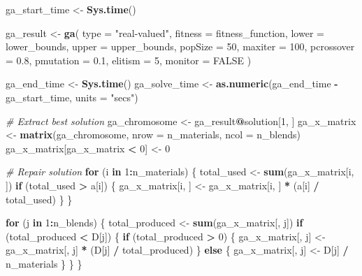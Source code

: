 \documentclass[
]{article}
\newenvironment{Shaded}{\begin{snugshade}}{\end{snugshade}}
\newcommand{\AttributeTok}[1]{\textcolor[rgb]{0.13,0.29,0.53}{#1}}
\newcommand{\CommentTok}[1]{\textcolor[rgb]{0.56,0.35,0.01}{\textit{#1}}}
\newcommand{\ConstantTok}[1]{\textcolor[rgb]{0.56,0.35,0.01}{#1}}
\newcommand{\ControlFlowTok}[1]{\textcolor[rgb]{0.13,0.29,0.53}{\textbf{#1}}}
\newcommand{\DecValTok}[1]{\textcolor[rgb]{0.00,0.00,0.81}{#1}}
\newcommand{\FloatTok}[1]{\textcolor[rgb]{0.00,0.00,0.81}{#1}}
\newcommand{\FunctionTok}[1]{\textcolor[rgb]{0.13,0.29,0.53}{\textbf{#1}}}
\newcommand{\NormalTok}[1]{#1}
\newcommand{\OtherTok}[1]{\textcolor[rgb]{0.56,0.35,0.01}{#1}}
\newcommand{\SpecialCharTok}[1]{\textcolor[rgb]{0.81,0.36,0.00}{\textbf{#1}}}
\newcommand{\StringTok}[1]{\textcolor[rgb]{0.31,0.60,0.02}{#1}}
\begin{document}
\begin{Shaded}
\begin{Highlighting}[]
\NormalTok{ga\_start\_time }\OtherTok{\textless{}{-}} \FunctionTok{Sys.time}\NormalTok{()}

\NormalTok{ga\_result }\OtherTok{\textless{}{-}} \FunctionTok{ga}\NormalTok{(}
  \AttributeTok{type =} \StringTok{"real{-}valued"}\NormalTok{,}
  \AttributeTok{fitness =}\NormalTok{ fitness\_function,}
  \AttributeTok{lower =}\NormalTok{ lower\_bounds,}
  \AttributeTok{upper =}\NormalTok{ upper\_bounds,}
  \AttributeTok{popSize =} \DecValTok{50}\NormalTok{,}
  \AttributeTok{maxiter =} \DecValTok{100}\NormalTok{,}
  \AttributeTok{pcrossover =} \FloatTok{0.8}\NormalTok{,}
  \AttributeTok{pmutation =} \FloatTok{0.1}\NormalTok{,}
  \AttributeTok{elitism =} \DecValTok{5}\NormalTok{,}
  \AttributeTok{monitor =} \ConstantTok{FALSE}
\NormalTok{)}

\NormalTok{ga\_end\_time }\OtherTok{\textless{}{-}} \FunctionTok{Sys.time}\NormalTok{()}
\NormalTok{ga\_solve\_time }\OtherTok{\textless{}{-}} \FunctionTok{as.numeric}\NormalTok{(ga\_end\_time }\SpecialCharTok{{-}}\NormalTok{ ga\_start\_time, }\AttributeTok{units =} \StringTok{"secs"}\NormalTok{)}

\CommentTok{\# Extract best solution}
\NormalTok{ga\_chromosome }\OtherTok{\textless{}{-}}\NormalTok{ ga\_result}\SpecialCharTok{@}\NormalTok{solution[}\DecValTok{1}\NormalTok{, ]}
\NormalTok{ga\_x\_matrix }\OtherTok{\textless{}{-}} \FunctionTok{matrix}\NormalTok{(ga\_chromosome, }\AttributeTok{nrow =}\NormalTok{ n\_materials, }\AttributeTok{ncol =}\NormalTok{ n\_blends)}
\NormalTok{ga\_x\_matrix[ga\_x\_matrix }\SpecialCharTok{\textless{}} \DecValTok{0}\NormalTok{] }\OtherTok{\textless{}{-}} \DecValTok{0}

\CommentTok{\# Repair solution}
\ControlFlowTok{for}\NormalTok{ (i }\ControlFlowTok{in} \DecValTok{1}\SpecialCharTok{:}\NormalTok{n\_materials) \{}
\NormalTok{  total\_used }\OtherTok{\textless{}{-}} \FunctionTok{sum}\NormalTok{(ga\_x\_matrix[i, ])}
  \ControlFlowTok{if}\NormalTok{ (total\_used }\SpecialCharTok{\textgreater{}}\NormalTok{ a[i]) \{}
\NormalTok{    ga\_x\_matrix[i, ] }\OtherTok{\textless{}{-}}\NormalTok{ ga\_x\_matrix[i, ] }\SpecialCharTok{*}\NormalTok{ (a[i] }\SpecialCharTok{/}\NormalTok{ total\_used)}
\NormalTok{  \}}
\NormalTok{\}}

\ControlFlowTok{for}\NormalTok{ (j }\ControlFlowTok{in} \DecValTok{1}\SpecialCharTok{:}\NormalTok{n\_blends) \{}
\NormalTok{  total\_produced }\OtherTok{\textless{}{-}} \FunctionTok{sum}\NormalTok{(ga\_x\_matrix[, j])}
  \ControlFlowTok{if}\NormalTok{ (total\_produced }\SpecialCharTok{\textless{}}\NormalTok{ D[j]) \{}
    \ControlFlowTok{if}\NormalTok{ (total\_produced }\SpecialCharTok{\textgreater{}} \DecValTok{0}\NormalTok{) \{}
\NormalTok{      ga\_x\_matrix[, j] }\OtherTok{\textless{}{-}}\NormalTok{ ga\_x\_matrix[, j] }\SpecialCharTok{*}\NormalTok{ (D[j] }\SpecialCharTok{/}\NormalTok{ total\_produced)}
\NormalTok{    \} }\ControlFlowTok{else}\NormalTok{ \{}
\NormalTok{      ga\_x\_matrix[, j] }\OtherTok{\textless{}{-}}\NormalTok{ D[j] }\SpecialCharTok{/}\NormalTok{ n\_materials}
\NormalTok{    \}}
\NormalTok{  \}}
\NormalTok{\}}


\end{Highlighting}
\end{Shaded}
\end{document}
